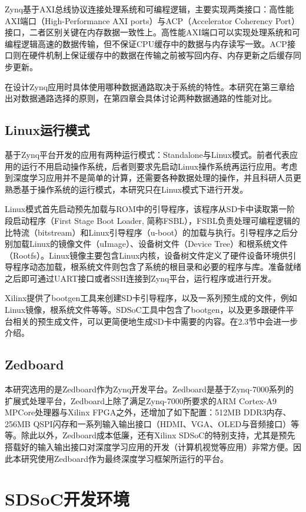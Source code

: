 Zynq基于AXI总线协议连接处理系统和可编程逻辑，主要实现两类接口：高性能AXI端口（High-Performance AXI ports）与ACP（Accelerator Coherency Port）接口，二者区别关键在内存数据一致性上。高性能AXI端口可以实现处理系统和可编程逻辑高速的数据传输，但不保证CPU缓存中的数据与内存读写一致。ACP接口则在硬件机制上保证缓存中的数据在传输之前被写回内存、内存更新之后缓存同步更新。

在设计Zynq应用时具体使用哪种数据通路取决于系统的特性。本研究在第三章给出对数据通路选择的原则，在第四章会具体讨论两种数据通路的性能对比。

\subsection{Linux运行模式}
基于Zynq平台开发的应用有两种运行模式：Standalone与Linux模式。前者代表应用的运行不用启动操作系统，后者则要求先启动Linux操作系统再运行应用。考虑到深度学习应用并不是简单的计算，还需要各种数据处理的操作，并且科研人员更熟悉基于操作系统的运行模式，本研究只在Linux模式下进行开发。

Linux模式首先启动预先加载与ROM中的引导程序，该程序从SD卡中读取第一阶段启动程序（First Stage Boot Loader, 简称FSBL），FSBL负责处理可编程逻辑的比特流（bitstream）和Linux引导程序（u-boot）的加载与执行。引导程序之后分别加载Linux的镜像文件（uImage）、设备树文件（Device Tree）和根系统文件（Rootfs）。Linux镜像主要包含Linux内核，设备树文件定义了硬件设备环境供引导程序动态加载，根系统文件则包含了系统的根目录和必要的程序与库。准备就绪之后即可通过UART接口或者SSH连接到Zynq平台，运行程序或进行开发。

Xilinx提供了bootgen工具来创建SD卡引导程序，以及一系列预生成的文件，例如Linux镜像，根系统文件等等。SDSoC工具中包含了bootgen，以及更多跟硬件平台相关的预生成文件，可以更简便地生成SD卡中需要的内容。在2.3节中会进一步介绍。

\subsection{Zedboard}
本研究选用的是Zedboard作为Zynq开发平台。Zedboard是基于Zynq-7000系列的扩展式处理平台，Zedboard上除了满足Zynq-7000所要求的ARM Cortex-A9 MPCore处理器与Xilinx FPGA之外，还增加了如下配置：512MB DDR3内存、256MB QSPI闪存和一系列输入输出接口（HDMI、VGA、OLED与音频接口）等等。除此以外，Zedboard成本低廉，还有Xilinx SDSoC的特别支持，尤其是预先搭载好的输入输出接口对深度学习应用的开发（计算机视觉等应用）非常方便。因此本研究使用Zedboard作为最终深度学习框架所运行的平台。

\section{SDSoC开发环境}

